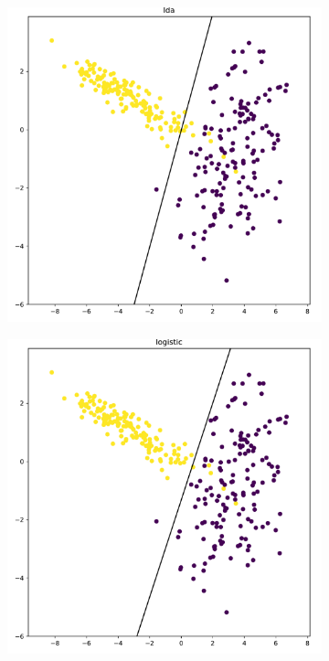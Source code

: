 \documentclass[9pt, oneside]{amsart}   	%
\begin{document}
\clearpage
\begin{figure}[t!]
\centering
\begin{subfigure}{.45\textwidth}
  \centering
  \includegraphics[width=\linewidth]{classificationB_lda.pdf}
\end{subfigure} \hspace{5pt}
\begin{subfigure}{.45\textwidth}
  \centering
  \includegraphics[width=\linewidth]{classificationB_logistic.pdf}

\end{subfigure}
\end{figure}
\end{document}
